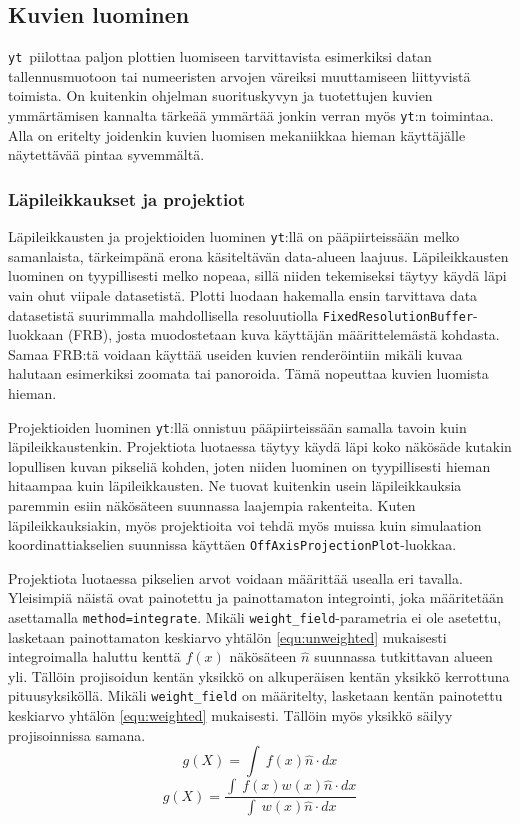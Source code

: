 \documentclass[12pt,a4paper]{article}
\newcommand{\yt}{\texttt{yt}}
\begin{document}
\subsection{Kuvien luominen}
\yt\ piilottaa paljon plottien luomiseen tarvittavista esimerkiksi datan tallennusmuotoon tai numeeristen arvojen väreiksi muuttamiseen liittyvistä toimista. On kuitenkin ohjelman suorituskyvyn ja tuotettujen kuvien ymmärtämisen kannalta tärkeää ymmärtää jonkin verran myös \yt :n toimintaa. Alla on eritelty joidenkin kuvien luomisen mekaniikkaa hieman käyttäjälle näytettävää pintaa syvemmältä.

\subsubsection{Läpileikkaukset ja projektiot}
Läpileikkausten ja projektioiden luominen \yt :llä on pääpiirteissään melko samanlaista, tärkeimpänä erona käsiteltävän data-alueen laajuus. Läpi\-leikkausten luominen on tyypillisesti melko nopeaa, sillä niiden tekemiseksi täytyy käydä läpi vain ohut viipale datasetistä. Plotti luodaan hakemalla ensin tarvittava data datasetistä suurimmalla mahdollisella resoluutiolla \texttt{Fixed\-Resolution\-Buffer}-luokkaan (FRB), josta muodostetaan kuva käyttäjän määrittelemästä kohdasta. Samaa FRB:tä voidaan käyttää useiden kuvien renderöintiin mikäli kuvaa halutaan esimerkiksi zoomata tai panoroida. Tämä nopeuttaa kuvien luomista hieman. \cite{sliceproj}

Projektioiden luominen \yt :llä onnistuu pääpiirteissään samalla tavoin kuin läpi\-leik\-kaus\-ten\-kin. Projektiota luotaessa täytyy käydä läpi koko näkösäde kutakin lopullisen kuvan pikseliä kohden, joten niiden luominen on tyypillisesti hieman hitaampaa kuin läpi\-leikkausten. Ne tuovat kuitenkin usein läpileikkauksia paremmin esiin näkösäteen suunnassa laajempia rakenteita. Kuten läpileikkauksiakin, myös projektioita voi tehdä myös muissa kuin simulaation koordinattiakselien suunnissa käyttäen \texttt{OffAxisProjectionPlot}-luokkaa. \cite{sliceproj}

\begin{sloppypar}Projektiota luotaessa pikselien arvot voidaan määrittää usealla eri tavalla. Yleisimpiä näistä ovat painotettu ja painottamaton integrointi, joka määritetään asettamalla \texttt{method=integrate}. Mikäli \texttt{weight\_field}-parametria ei ole asetettu, lasketaan painottamaton keskiarvo yhtälön \ref{equ:unweighted} mukaisesti integroimalla haluttu kenttä $f(x)$ näkösäteen $\hat{n}$ suunnassa tutkittavan alueen yli. Tällöin projisoidun kentän yksikkö on alkuperäisen kentän yksikkö kerrottuna pituusyksiköllä. Mikäli \texttt{weight\_field} on määritelty, lasketaan kentän painotettu keskiarvo yhtälön \ref{equ:weighted} mukaisesti. Tällöin myös yksikkö säilyy projisoinnissa samana. \cite{sliceproj}
\begin{equation}\label{equ:unweighted}
	g(X) = {\int\ {f(x)\hat{n}\cdot{dx}}}
\end{equation}
\begin{equation}\label{equ:weighted}
	g(X) = \frac{\int\ {f(x)w(x)\hat{n}\cdot{dx}}}{\int\ {w(x)\hat{n}\cdot{dx}}}
\end{equation}
\end{sloppypar} 
\end{document}
